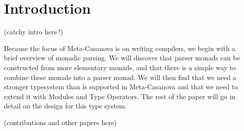 \section{Introduction}
(catchy intro here?)

Because the focus of Meta-Casanova is on writing compilers,
we begin with a brief overview of monadic parsing.
We will discover that parser monads can be constructed from more elementary monads,
and that there is a simple way to combine these monads into a parser monad.
We will then find that we need a stronger typesystem than is supported in Meta-Casanova
and that we need to extend it with Modules and Type Operators.
The rest of the paper will go in detail on the design for this type system.

(contributions and other papers here)

